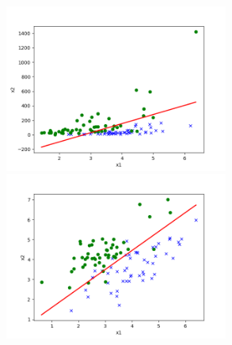 \begin{answer}
\newline
  \includegraphics[height=5.5cm]{../src/output/p01e_pred_1.png}
  \includegraphics[height=5.5cm]{../src/output/p01e_pred_2.png}
\end{answer}
